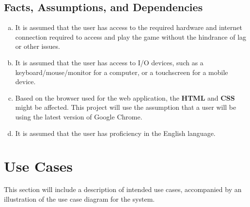 \documentclass[]{article}
\begin{document}
\subsection{Facts, Assumptions, and Dependencies}
\label{sub:assumptions_and_dependencies}
\begin{enumerate}[a)]
    \item It is assumed that the user has access to the required hardware and internet connection required to access and play the game without the hindrance of lag or other issues.
    \item It is assumed that the user has access to I/O devices, such as a keyboard/mouse/monitor for a computer, or a touchscreen for a mobile device.
	\item Based on the browser used for the web application, the  \textbf{HTML} and  \textbf{CSS} might be affected. This project will use the assumption that a user will be using the latest version of Google Chrome.
	\item It is assumed that the user has proficiency in the English language.
\end{enumerate}

\section{Use Cases}
\label{sec:use_case_diagram}
This section will include a description of intended use cases, accompanied by an illustration of the use case diagram for the system.
\end{document}
